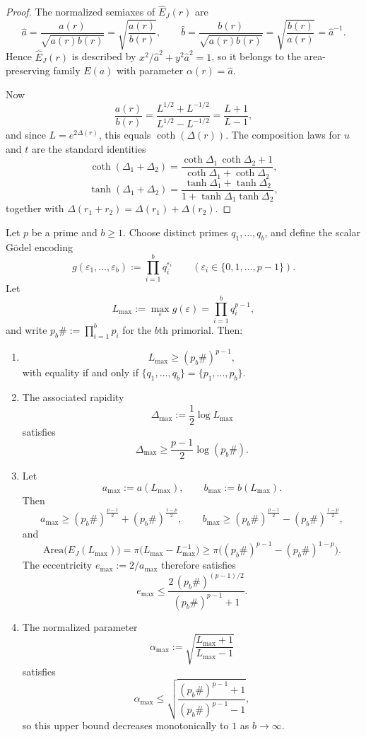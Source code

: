 \begin{proof}
The normalized semiaxes of \(\widehat E_J(r)\) are
\[
\hat a=\frac{a(r)}{\sqrt{a(r)b(r)}}=\sqrt{\frac{a(r)}{b(r)}},
\qquad
\hat b=\frac{b(r)}{\sqrt{a(r)b(r)}}=\sqrt{\frac{b(r)}{a(r)}}=\hat a^{-1}.
\]
Hence \(\widehat E_J(r)\) is described by \(x^2/\hat a^2+y^2\hat a^2=1\), so it belongs to the area-preserving family \(E(a)\) with parameter \(\alpha(r)=\hat a\).

Now
\[
\frac{a(r)}{b(r)}
=\frac{L^{1/2}+L^{-1/2}}{L^{1/2}-L^{-1/2}}
=\frac{L+1}{L-1},
\]
and since \(L=e^{2\Delta(r)}\), this equals \(\coth(\Delta(r))\). The composition laws for \(u\) and \(t\) are the standard identities
\[
\coth(\Delta_1+\Delta_2)
=\frac{\coth\Delta_1\,\coth\Delta_2+1}{\coth\Delta_1+\coth\Delta_2},
\]
\[
\tanh(\Delta_1+\Delta_2)
=\frac{\tanh\Delta_1+\tanh\Delta_2}{1+\tanh\Delta_1\tanh\Delta_2},
\]
together with \(\Delta(r_1+r_2)=\Delta(r_1)+\Delta(r_2)\).
\end{proof}

\begin{proposition}\label{prop:boundary-primorial-ellipse-bound}
Let \(p\) be a prime and \(b\ge 1\). Choose distinct primes \(q_1,\dots,q_b\), and define the scalar G\"odel encoding
\[
g(\varepsilon_1,\dots,\varepsilon_b):=\prod_{i=1}^{b}q_i^{\varepsilon_i}
\qquad
(\varepsilon_i\in\{0,1,\dots,p-1\}).
\]
Let
\[
L_{\max}:=\max_{\varepsilon}g(\varepsilon)=\prod_{i=1}^{b}q_i^{p-1},
\]
and write \(p_b\#:=\prod_{i=1}^{b}p_i\) for the \(b\)th primorial. Then:
\begin{enumerate}
  \item
  \[
  L_{\max}\ge (p_b\#)^{p-1},
  \]
  with equality if and only if \(\{q_1,\dots,q_b\}=\{p_1,\dots,p_b\}\).

  \item The associated rapidity
  \[
  \Delta_{\max}:=\frac12\log L_{\max}
  \]
  satisfies
  \[
  \Delta_{\max}\ge \frac{p-1}{2}\log(p_b\#).
  \]

  \item Let
  \[
  a_{\max}:=a(L_{\max}),
  \qquad
  b_{\max}:=b(L_{\max}).
  \]
  Then
  \[
  a_{\max}\ge (p_b\#)^{\frac{p-1}{2}}+(p_b\#)^{\frac{1-p}{2}},
  \qquad
  b_{\max}\ge (p_b\#)^{\frac{p-1}{2}}-(p_b\#)^{\frac{1-p}{2}},
  \]
  and
  \[
  \mathrm{Area}\bigl(E_J(L_{\max})\bigr)
  =\pi\bigl(L_{\max}-L_{\max}^{-1}\bigr)
  \ge
  \pi\bigl((p_b\#)^{p-1}-(p_b\#)^{1-p}\bigr).
  \]
  The eccentricity \(e_{\max}:=2/a_{\max}\) therefore satisfies
  \[
  e_{\max}\le
  \frac{2\,(p_b\#)^{(p-1)/2}}{(p_b\#)^{p-1}+1}.
  \]

  \item The normalized parameter
  \[
  \alpha_{\max}:=\sqrt{\frac{L_{\max}+1}{L_{\max}-1}}
  \]
  satisfies
  \[
  \alpha_{\max}\le
  \sqrt{\frac{(p_b\#)^{p-1}+1}{(p_b\#)^{p-1}-1}},
  \]
  so this upper bound decreases monotonically to \(1\) as \(b\to\infty\).
\end{enumerate}
\end{proposition}

